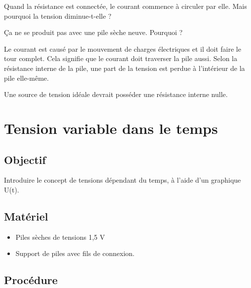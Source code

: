 \documentclass{book}
\begin{document}
Quand la résistance est connectée, le courant commence à circuler par elle. Mais pourquoi la tension diminue-t-elle ?



Ça ne se produit pas avec une pile sèche neuve. Pourquoi ?



Le courant est causé par le mouvement de charges électriques et il doit faire le tour complet. Cela signifie que le courant doit traverser la pile aussi. Selon la résistance interne de la pile, une part de la tension est perdue à l'intérieur de la pile elle-même.



Une source de tension idéale devrait posséder une résistance interne nulle.







\section{Tension variable dans le temps}



\subsection{Objectif}


Introduire le concept de tensions dépendant du temps, à l'aide d'un graphique U(t).




\subsection{Matériel}


\begin{itemize}
  \item Piles sèches de tensions 1,5 V
  \item Support de piles avec fils de connexion.
\end{itemize}

\subsection{Procédure}
\end{document}
